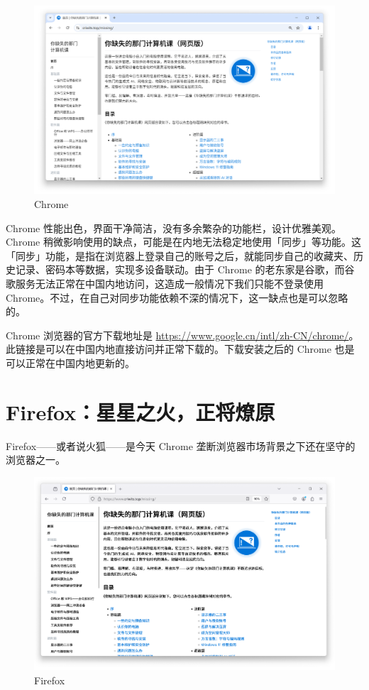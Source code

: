 \begin{figure}[htb!]
  \centering
  \includegraphics[width=.75\textwidth]{assets/software/Missing_homepage_in_Chrome.png}
  \caption{Chrome}
  \label{fig:Missing_homepage_in_Chrome}
\end{figure}

Chrome 性能出色，界面干净简洁，没有多余繁杂的功能栏，设计优雅美观。Chrome 稍微影响使用的缺点，可能是在内地无法稳定地使用「同步」等功能。这「同步」功能，是指在浏览器上登录自己的账号之后，就能同步自己的收藏夹、历史记录、密码本等数据，实现多设备联动。由于 Chrome 的老东家是谷歌，而谷歌服务无法正常在中国内地访问，这造成一般情况下我们只能不登录使用 Chrome。不过，在自己对同步功能依赖不深的情况下，这一缺点也是可以忽略的。

Chrome 浏览器的官方下载地址是 \url{https://www.google.cn/intl/zh-CN/chrome/}。此链接是可以在中国内地直接访问并正常下载的。下载安装之后的 Chrome 也是可以正常在中国内地更新的。

\section{Firefox：星星之火，正将燎原}

Firefox——或者说火狐——是今天 Chrome 垄断浏览器市场背景之下还在坚守的浏览器之一。

\begin{figure}[htb!]
  \centering
  \includegraphics[width=.75\textwidth]{assets/software/Missing_homepage_in_Firefox.png}
  \caption{Firefox}
  \label{fig:Missing_homepage_in_Firefox}
\end{figure}


